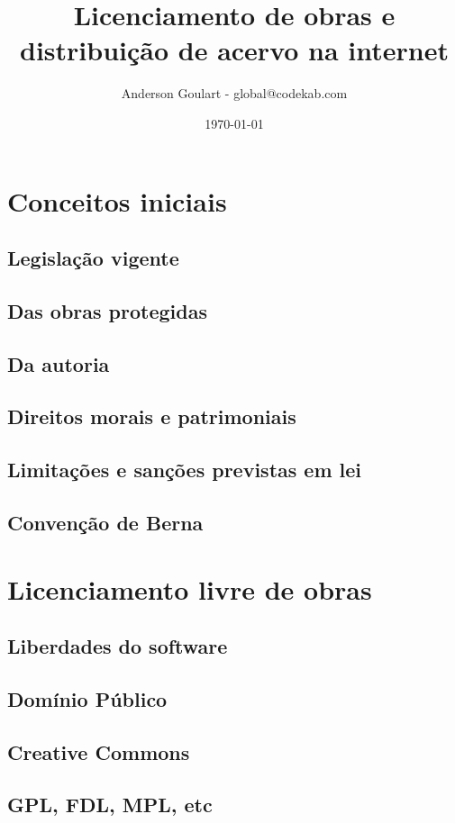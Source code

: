 \documentclass{beamer}
\title{Licenciamento de obras e distribuição de acervo na internet}
\author{Anderson Goulart - global@codekab.com}
\date{\today}
\begin{document}
\frame{\titlepage}

\section[Outline]{}
\frame{\tableofcontents}

\section{Conceitos iniciais}
\subsection{Legislação vigente}
\subsection{Das obras protegidas}
\subsection{Da autoria}
\subsection{Direitos morais e patrimoniais}
\subsection{Limitações e sanções previstas em lei}
\subsection{Convenção de Berna}

\section{Licenciamento livre de obras}
\subsection{Liberdades do software}
\subsection{Domínio Público}
\subsection{Creative Commons}
\subsection{GPL, FDL, MPL, etc}
\end{document}
